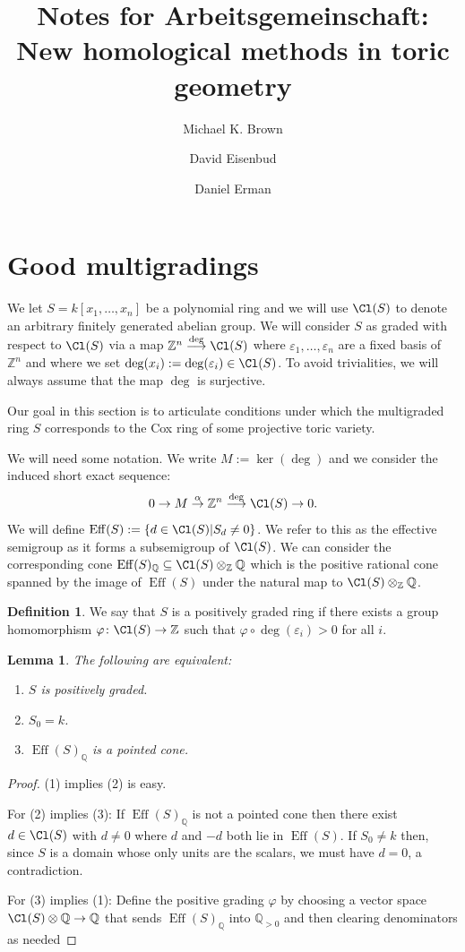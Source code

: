\documentclass[11pt]{amsart}
\title[New homological methods in toric geometry]{Notes for Arbeitsgemeinschaft:  \\ New homological methods in toric geometry}
\author{Michael K. Brown}
\author{David Eisenbud}
\author{Daniel Erman}
\numberwithin{equation}{section}
\newtheorem{lemma}[equation]{Lemma}
\theoremstyle{definition}
\newtheorem{defn}[equation]{Definition}
\theoremstyle{remark}
\newcommand{\ZZ}{\mathbb Z}
\newcommand{\QQ}{\mathbb Q}
\newcommand{\Eff}{\operatorname{Eff}}
\newcommand{\defi}[1]{\textsf{#1}} %
\def\phi{\varphi}
\def\epsilon{\varepsilon}
\begin{document}
    \maketitle

\section{Good multigradings}
We let $S=k[x_1, \dots, x_n]$ be a polynomial ring and we will use $\Cl(S)$ to denote an arbitrary finitely generated abelian group.  We will consider $S$ as graded with respect to $\Cl(S)$ via a map $\ZZ^n\overset{\deg}{\longrightarrow}\Cl(S)$ where $\epsilon_1, \dots, \epsilon_n$ are a fixed basis of $\ZZ^n$ and where we set $\deg(x_i) :=\deg(\epsilon_i)\in \Cl(S)$.  
To avoid trivialities, we will always assume that the map $\deg$ is surjective.

Our goal in this section is to articulate conditions under which the multigraded ring $S$ corresponds to the Cox ring of some projective toric variety.

We will need some notation.  We write $M:=\ker(\deg)$ and we consider the induced short exact sequence:
\[
0\to M\overset{\alpha}{\to} \ZZ^n \overset{\deg}{\longrightarrow} \Cl(S) \to 0.
\]
We will define $\Eff(S) :=\{d \in \Cl(S) | S_d \ne 0\}$.  We refer to this as the \defi{effective semigroup} as it forms a subsemigroup of $\Cl(S)$.  We can consider the corresponding cone $\Eff(S)_{\QQ}\subseteq \Cl(S)\otimes_{\ZZ}\QQ$ which is the positive rational cone spanned by the image of $\Eff(S)$ under the natural map to $\Cl(S)\otimes_{\ZZ}\QQ$.


\begin{defn}\label{defn:posGrading}
    We say that $S$ is a \defi{positively graded ring} if there exists a group homomorphism $\phi\colon \Cl(S) \to \ZZ$ such that $\phi \circ \deg(\epsilon_i) > 0 $ for all $i$.
\end{defn}
\begin{lemma}
The following are equivalent:
\begin{enumerate}
    \item $S$ is positively graded.
    \item $S_0=k$.
    \item $\Eff(S)_{\QQ}$ is a pointed cone.
\end{enumerate}
\end{lemma}
\begin{proof}
(1) implies (2) is easy.

For (2) implies (3):  If $\Eff(S)_{\QQ}$ is not a pointed cone then there exist $d\in \Cl(S)$ with $d\neq 0$ where $d$ and $-d$ both lie in $\Eff(S)$. If $S_0\ne k$ then, since $S$ is a domain whose only units are the 
scalars, we must have $d=0$, a contradiction.

For (3) implies (1):  Define the positive grading $\phi$ by choosing a vector space $\Cl(S)\otimes \QQ\to \QQ$ that sends $\Eff(S)_{\QQ}$ into $\QQ_{>0}$ and then clearing denominators as needed
\end{proof}
\end{document}
